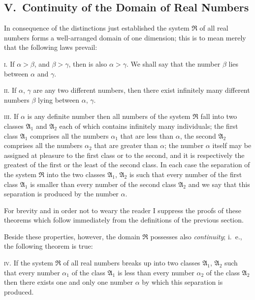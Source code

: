 \documentclass[twoside,openright]{article}
\begin{document}
\subsection*{V.\ Continuity of the Domain of Real Numbers}

In consequence of the distinctions just established the system
$\mathfrak{R}$ of all real
numbers forms a well-arranged domain of one dimension; this is to mean
merely that the following laws prevail:

\textsc{i.} If $\alpha>\beta$, and $\beta>\gamma$, then is also
$\alpha>\gamma$. We shall say that the number $\beta$ lies between
$\alpha$ and $\gamma$.

\textsc{ii.} If $\alpha$, $\gamma$ are any two different numbers, then
there exist infinitely many different numbers $\beta$ lying between
$\alpha$, $\gamma$.

\textsc{iii.} If $\alpha$ is any definite number then all numbers of
the system $\mathfrak{R}$ fall into two classes $\mathfrak{A}_1$ and
$\mathfrak{A}_2$ each of which contains infinitely many individuals;
the first class $\mathfrak{A}_1$ comprises all the numbers $\alpha_1$
that are less than $\alpha$, the second $\mathfrak{A}_2$ comprises all
the numbers $\alpha_2$ that are greater than $\alpha$; the number
$\alpha$ itself may be assigned at pleasure to the first class or to
the second, and it is respectively the greatest of the first or the
least of the second class. In each case the separation of the system
$\mathfrak{R}$ into the two classes $\mathfrak{A}_1$, $\mathfrak{A}_2$
is such that every number of the first class $\mathfrak{A}_1$ is smaller
than every number of the second class $\mathfrak{A}_2$ and we say that
this separation is produced by the number $\alpha$.

For brevity and in order not to weary the reader I suppress the proofs
of these theorems which follow immediately from the definitions of the
previous section.

Beside these properties, however, the domain $\mathfrak{R}$ possesses
also \textit{continuity}; i.~e., the following theorem is true:

\textsc{iv.} \label{EISViv}If the system $\mathfrak{R}$ of all real
numbers breaks up into two classes $\mathfrak{A}_1$, $\mathfrak{A}_2$
such that every number $\alpha_1$ of the class $\mathfrak{A}_1$ is
less than every number $\alpha_2$ of the class $\mathfrak{A}_2$ then
there exists one and only one number $\alpha$ by which this separation
is produced.
\end{document}
